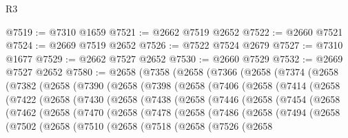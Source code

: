\begin{lexlean}{R3}
\begin{coremodule}
@7519 := @7310 @1659
@7521 := @2662 @7519 @2652
@7522 := @2660 @7521
@7524 := @2669 @7519 @2652
@7526 := @7522 @7524 @2679
@7527 := @7310 @1677
@7529 := @2662 @7527 @2652
@7530 := @2660 @7529
@7532 := @2669 @7527 @2652
@7580 := @2658
    (@7358
      (@2658
        (@7366
          (@2658
            (@7374
              (@2658
                (@7382
                  (@2658
                    (@7390
                      (@2658
                        (@7398
                          (@2658
                            (@7406
                              (@2658
                                (@7414
                                  (@2658
                                    (@7422
                                      (@2658
                                        (@7430
                                          (@2658
                                            (@7438
                                              (@2658
                                                (@7446
                                                  (@2658
                                                    (@7454
                                                      (@2658
                                                        (@7462
                                                          (@2658
                                                            (@7470
                                                              (@2658
                                                                (@7478
                                                                  (@2658
                                                                    (@7486
                                                                      (@2658
                                                                        (@7494
                                                                          (@2658
                                                                            (@7502
                                                                              (@2658
                                                                                (@7510
                                                                                  (@2658
                                                                                    (@7518
                                                                                      (@2658
                                                                                        (@7526
                                                                                          (@2658

\end{coremodule}
\end{lexlean}
